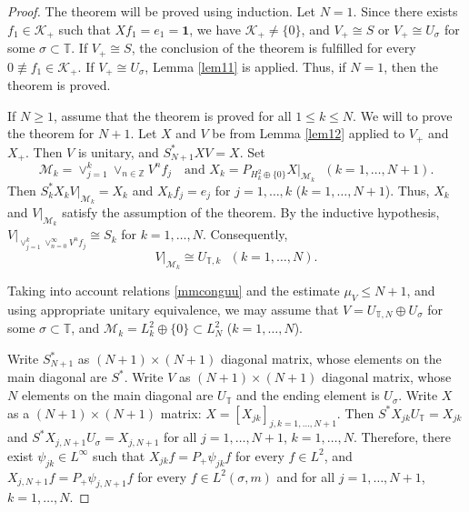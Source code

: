 \documentclass[a4paper,oneside,11pt]{amsart}
\numberwithin{equation}{section}
\theoremstyle{plain}
\theoremstyle{definition}
\begin{document}
\begin{proof} The theorem will be proved using induction. 
Let $N=1$. Since there exists $f_1\in\mathcal K_+$ such that $Xf_1=e_1=\mathbf{1}$, we have 
 $\mathcal K_+\neq\{0\}$, and $V_+\cong S$ or $V_+\cong U_\sigma$ for some $\sigma\subset\mathbb T$. If $V_+\cong S$, 
the conclusion of the theorem
is fulfilled for every $0\not\equiv f_1\in\mathcal K_+$. If $V_+\cong U_\sigma$, Lemma \ref{lem11} is applied.   
Thus, if $N=1$, then the theorem is proved.

If $N\geq 1$, assume that the theorem is proved for all $1\leq k\leq N$. 
We will to prove the theorem for $N+1$. Let $X$ and $V$ be from Lemma \ref{lem12} applied to $V_+$ and $X_+$. 
Then $V$ is unitary, and  $S_{N+1}^*XV=X$. Set
\begin{equation} \mathcal M_k=\vee_{j=1}^k\vee_{n\in\mathbb Z}V^n f_j 
\ \ \  \text{ and } X_k=P_{H_k^2\oplus\{0\}}X|_{\mathcal M_k} \ \ \ (k=1,\ldots, N+1). 
\end{equation} 
Then $S_k^*X_kV|_{\mathcal M_k} =X_k$ and $X_kf_j=e_j$ for $j=1, \ldots, k$ ($k=1,\ldots, N+1$). Thus,  
$X_k$ and $V|_{\mathcal M_k}$ satisfy the assumption of the theorem. By the inductive hypothesis, 
$V|_{\vee_{j=1}^k \vee_{n=0}^\infty V^n f_j}\cong S_k$ for $k=1, \ldots, N$. Consequently,
\begin{equation}\label{mmconguu} V|_{\mathcal M_k}\cong U_{\mathbb T,k}\ \ \  (k=1, \ldots, N). \end{equation}


Taking into account relations \eqref{mmconguu} and the estimate $\mu_V\leq N+1$, and using appropriate unitary equivalence, we may assume that $V=U_{\mathbb T,N}\oplus U_\sigma$ 
for some $\sigma\subset \mathbb T$, and $\mathcal M_k=L^2_k\oplus\{0\}\subset L^2_N$ ($k=1, \ldots, N$). 

Write $S_{N+1}^*$ as $(N+1)\times (N+1)$  diagonal   matrix, whose elements on the main diagonal are 
$S^*$. Write  $V$  as $(N+1)\times (N+1)$  diagonal   matrix, whose $N$ elements on the main diagonal are  $U_{\mathbb T}$
and the ending element is $U_\sigma$. Write $X$ as a $(N+1)\times (N+1)$ matrix: 
$X=[X_{jk}]_{j,k=1,\ldots, N+1}$.  
Then  $S^*X_{jk}U_{\mathbb T}=X_{jk}$  and $S^*X_{j, N+1}U_{\sigma}=X_{j, N+1}$ for all $j=1,\ldots, N+1$, $k=1,\ldots,N$. 
Therefore, there exist 
$\psi_{jk}\in L^\infty$ such that $X_{jk}f=P_+\psi_{jk} f$ for every $f\in L^2$, and $X_{j,N+1}f=P_+\psi_{j,N+1} f$ for every $f\in L^2(\sigma,m)$ and for all $j=1,\ldots, N+1$, $k=1,\ldots,N$.


\end{proof}
\end{document}
